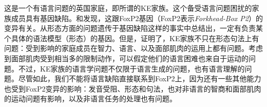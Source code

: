 这是一个有语言问题的英国家庭，即所谓的KE家族。这个备受语言问题困扰的家族成员具有基因缺陷。\citet{FVKWMP98a}和\citet{LFHVM2001a}发现，这跟FoxP2基因（FoxP2表示\emph{Forkhead-Box P2}）的变异有关。\citet{GC91a}从形态方面的问题遗传于基因缺陷这样的事实中总结出，一定有负责某个具体的语法模型（形态）的基因。但是，\citet[]{VKWAFP95a}证明了，KE家族不只在形态句法上有问题：受到影响的家庭成员在智力、语言、以及面部肌肉的运用上都有问题。考虑到面部肌肉受到相当多的限制动作，可以假定他们的语言困难也来自于运动的问题\citep[]{Tomasello2003a}。不过，KE家族的语言学问题不仅限于语言生成的问题，也有语言理解的问题\citep[]{Bishop2002a}。尽管如此，我们不能将语言缺陷直接联系到FoxP2上，因为还有一些其他能力也受到FoxP2变异的影响：发音受阻、形态和句法，也对非语言的智商和面部肌肉的运动问题有影响，以及非语言任务的处理也有问题\citep{VKWAFP95a}。

